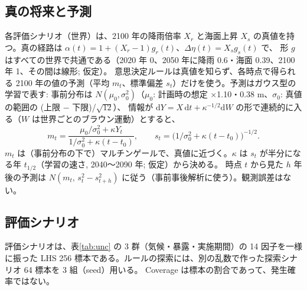 \documentclass[a4paper,10pt]{ltjsarticle}
\begin{document}
\subsection{真の将来と予測}
各評価シナリオ（世界）は、2100 年の降雨倍率 $X_r$ と海面上昇 $X_s$ の真値を持つ。真の経路は $\alpha(t)=1+(X_r-1)g_r(t)$、$\Delta\eta(t)=X_s g_s(t)$ で、
形 $g$ はすべての世界で共通である（2020 年 0、2050 年に降雨 0.6・海面 0.39、2100 年 1、その間は線形; 仮定）。
意思決定ルールは真値を知らず、各時点で得られる 2100 年の値の予測（平均 $m_t$、標準偏差 $s_t$）だけを使う。予測はガウス型の学習で表す:
事前分布は $N(\mu_0,\sigma_0^2)$（$\mu_0$: 計画時の想定 ×1.10・0.38 m、$\sigma_0$: 真値の範囲の (上限 − 下限)/$\sqrt{12}$）、
情報が $\mathrm{d}Y=X\,\mathrm{d}t+\kappa^{-1/2}\mathrm{d}W$ の形で連続的に入る（$W$ は世界ごとのブラウン運動）とすると、
\begin{equation}
m_t=\frac{\mu_0/\sigma_0^2+\kappa Y_t}{1/\sigma_0^2+\kappa(t-t_0)},\qquad s_t=\bigl(1/\sigma_0^2+\kappa(t-t_0)\bigr)^{-1/2}.
\label{eq:forecast}
\end{equation}
$m_t$ は（事前分布の下で）マルチンゲールで、真値に近づく。$\kappa$ は $s_t$ が半分になる年 $t_{1/2}$（学習の速さ, 2040〜2090 年; 仮定）から決める。
時点 $t$ から見た $h$ 年後の予測は $N(m_t,\,s_t^2-s_{t+h}^2)$ に従う（事前事後解析に使う）。観測誤差はない。

\subsection{評価シナリオ}
評価シナリオは、表\ref{tab:unc} の 3 群（気候・暴露・実施期間）の 14 因子を一様に振った LHS\cite{mckay1979} 256 標本である。ルールの探索には、別の乱数で作った探索シナリオ 64 標本を 3 組（seed）用いる。
Coverage は標本の割合であって、発生確率ではない。
\end{document}
